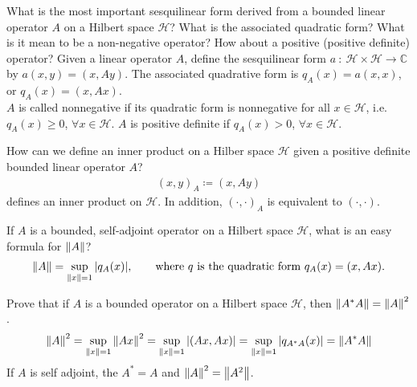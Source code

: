 \documentclass[avery5388,grid,frame]{flashcards}
\newcommand{\f}[3]{#1\ :\ #2 \rightarrow #3}
\def\Cx{\mathbb{C}}
\def\hilb{\mathcal{H}}
\begin{document}
\begin{flashcard}
    {What is the most important sesquilinear form derived from a bounded linear operator $A$ on a Hilbert space $\hilb$?  What is the associated quadratic form?  What is it mean to be a non-negative operator?  How about a positive (positive definite) operator?}
    Given a linear operator $A$, define the sesquilinear form $\f{a}{\hilb\times\hilb}{\Cx}$ by $a(x,y) = (x, Ay)$.  The associated quadrative form is $q_A(x) = a(x,x)$, or $q_A(x) = (x, Ax)$. \\

    $A$ is called nonnegative if its quadratic form is nonnegative for all $x \in \hilb$, i.e.~$q_A(x) \geq 0$, $\forall x \in \hilb$.  $A$ is positive definite if $q_A(x) > 0$, $\forall x \in \hilb$.
\end{flashcard}

\begin{flashcard}
    {How can we define an inner product on a Hilber space $\hilb$ given a positive definite bounded linear operator $A$?}
    \begin{align*}
        (x,y)_A \coloneqq (x, Ay)
    \end{align*}
    defines an inner product on $\hilb$.  In addition, $(\cdot,\cdot)_A$ is equivalent to $(\cdot,\cdot)$.
\end{flashcard}

\begin{flashcard}
    {If $A$ is a bounded, self-adjoint operator on a Hilbert space $\hilb$, what is an easy formula for $\norm{A}$?}
    \begin{align*}
        \norm{A} = \sup_{\norm{x}=1}\abs{q_A(x)}, \qquad \text{where $q$ is the quadratic form $q_A(x) = (x, Ax)$.}
    \end{align*}
\end{flashcard}

\begin{flashcard}
    {Prove that if $A$ is a bounded operator on a Hilbert space $\hilb$, then $\norm{A^*A} = \norm{A}^2$.}
    \begin{align*}
        \norm{A}^2 = \sup_{\norm{x}=1}\norm{Ax}^2 = \sup_{\norm{x}=1}\abs{(Ax,Ax)} = \sup_{\norm{x}=1}\abs{q_{A^*A}(x)} = \norm{A^*A}
    \end{align*}
    If $A$ is self adjoint, the $A^* = A$ and $\norm{A}^2 = \norm{A^2}$.
\end{flashcard}
\end{document}
